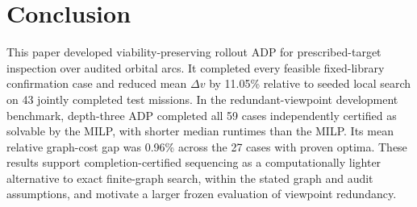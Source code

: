\documentclass{IEEEtaes}
\begin{document}




\section{Conclusion}
\label{sec:conclusion}

This paper developed viability-preserving rollout ADP for prescribed-target inspection over audited orbital arcs. It completed every feasible fixed-library confirmation case and reduced mean $\Delta v$ by 11.05\% relative to seeded local search on 43 jointly completed test missions. In the redundant-viewpoint development benchmark, depth-three ADP completed all 59 cases independently certified as solvable by the MILP, with shorter median runtimes than the MILP. Its mean relative graph-cost gap was 0.96\% across the 27 cases with proven optima. These results support completion-certified sequencing as a computationally lighter alternative to exact finite-graph search, within the stated graph and audit assumptions, and motivate a larger frozen evaluation of viewpoint redundancy.
\end{document}
